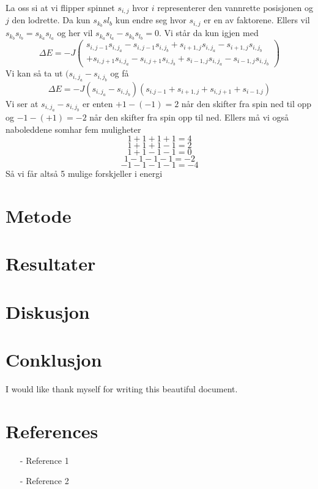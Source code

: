 \documentclass[reprint,english,notitlepage]{revtex4-2}  %
\begin{document}
La oss si at vi flipper spinnet $s_{i,j}$ hvor $i$ representerer den vannrette posisjonen og $j$ den lodrette. Da kun $s_{k_b}s{l_b}$ kun endre seg hvor $s_{i,j}$ er en av faktorene. Ellers vil $s_{k_b}s_{l_b}=s_{k_a}s_{l_a}$ og her vil $s_{k_a}s_{l_a}-s_{k_b}s_{l_b}=0$. Vi står da kun igjen med
$$
\Delta E= -J \begin{pmatrix} s_{i,j-1}s_{i,j_a}-s_{i,j-1}s_{i,j_b}+s_{i+1,j}s_{i,j_a}-s_{i+1,j}s_{i,j_b} \\+ s_{i,j+1}s_{i,j_a}-s_{i,j+1}s_{i,j_b}+s_{i-1,j}s_{i,j_a}-s_{i-1,j}s_{i,j_b}\end{pmatrix}
$$
Vi kan så ta ut $(s_{i,j_a}-s_{i,j_b}$ og få
$$
\Delta E=-J(s_{i,j_a}-s_{i,j_b})(
s_{i.j-1}+s_{i+1,j} +s_{i,j+1}+s_{i-1.j}
)
$$
Vi ser at $s_{i,j_a}-s_{i,j_b}$ er enten $+1-(-1)=2$ når den skifter fra spin ned til opp og $-1-(+1)=-2$ når den skifter fra spin opp til ned. Ellers må vi også naboleddene somhar fem muligheter
$$
1+1+1+1=4
$$
$$
1+1+1-1=2
$$
$$
1+1-1-1=0
$$
$$
1-1-1-1=-2
$$
$$
-1-1-1-1=-4
$$
Så vi får altså 5 mulige forskjeller i energi

\section{Metode}
\section{Resultater}
\section{Diskusjon}
\section{Conklusjon}
\begin{acknowledgments}  %
I would like thank myself for writing this beautiful document.
\end{acknowledgments}


\section*{References}  %
\begin{itemize}
\item[-]Reference 1
\item[-]Reference 2
\end{itemize}
\end{document}
